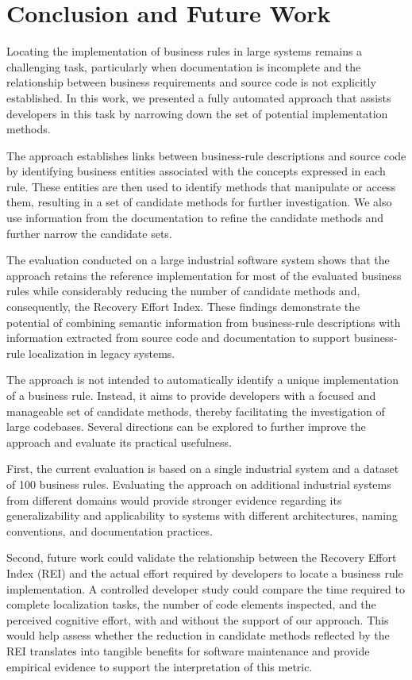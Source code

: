 \section{Conclusion and Future Work}
\label{sec:conclusion}

Locating the implementation of business rules in large systems remains a challenging task, particularly when documentation is incomplete and the relationship between business requirements and source code is not explicitly established. In this work, we presented a fully automated approach that assists developers in this task by narrowing down the set of potential implementation methods.

The approach establishes links between business-rule descriptions and source code by identifying business entities associated with the concepts expressed in each rule. These entities are then used to identify methods that manipulate or access them, resulting in a set of candidate methods for further investigation. We also use information from the documentation to refine the candidate methods and further narrow the candidate sets.

The evaluation conducted on a large industrial software system shows that the approach retains the reference implementation for most of the evaluated business rules while considerably reducing the number of candidate methods and, consequently, the Recovery Effort Index. These findings demonstrate the potential of combining semantic information from business-rule descriptions with information extracted from source code and documentation to support business-rule localization in legacy systems.

The approach is not intended to automatically identify a unique implementation of a business rule. Instead, it aims to provide developers with a focused and manageable set of candidate methods, thereby facilitating the investigation of large codebases. Several directions can be explored to further improve the approach and evaluate its practical usefulness.

First, the current evaluation is based on a single industrial system and a dataset of 100 business rules. Evaluating the approach on additional industrial systems from different domains would provide stronger evidence regarding its generalizability and applicability to systems with different architectures, naming conventions, and documentation practices.

Second, future work could validate the relationship between the Recovery Effort Index (REI) and the actual effort required by developers to locate a business rule implementation. A controlled developer study could compare the time required to complete localization tasks, the number of code elements inspected, and the perceived cognitive effort, with and without the support of our approach. This would help assess whether the reduction in candidate methods reflected by the REI translates into tangible benefits for software maintenance and provide empirical evidence to support the interpretation of this metric.

